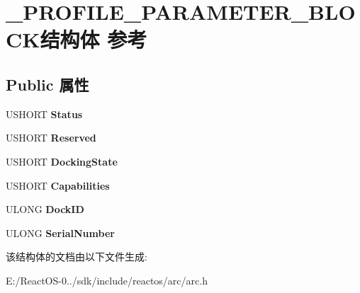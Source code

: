 \hypertarget{struct___p_r_o_f_i_l_e___p_a_r_a_m_e_t_e_r___b_l_o_c_k}{}\section{\+\_\+\+P\+R\+O\+F\+I\+L\+E\+\_\+\+P\+A\+R\+A\+M\+E\+T\+E\+R\+\_\+\+B\+L\+O\+C\+K结构体 参考}
\label{struct___p_r_o_f_i_l_e___p_a_r_a_m_e_t_e_r___b_l_o_c_k}
\subsection*{Public 属性}
\begin{DoxyCompactItemize}
\item 
\mbox{\label{struct___p_r_o_f_i_l_e___p_a_r_a_m_e_t_e_r___b_l_o_c_k_ab8d5269ed41124bcce98fec36a69e68e}} 
U\+S\+H\+O\+RT {\bfseries Status}
\item 
\mbox{\label{struct___p_r_o_f_i_l_e___p_a_r_a_m_e_t_e_r___b_l_o_c_k_a0cd9c38ae33a29549b7f6989a08affc7}} 
U\+S\+H\+O\+RT {\bfseries Reserved}
\item 
\mbox{\label{struct___p_r_o_f_i_l_e___p_a_r_a_m_e_t_e_r___b_l_o_c_k_a49898c2345052d167073129e30d5dc45}} 
U\+S\+H\+O\+RT {\bfseries Docking\+State}
\item 
\mbox{\label{struct___p_r_o_f_i_l_e___p_a_r_a_m_e_t_e_r___b_l_o_c_k_a842ec1a0f65dc72fbc49e3dd51204a58}} 
U\+S\+H\+O\+RT {\bfseries Capabilities}
\item 
\mbox{\label{struct___p_r_o_f_i_l_e___p_a_r_a_m_e_t_e_r___b_l_o_c_k_a8e064f9a061001a257aa92e32b9389b9}} 
U\+L\+O\+NG {\bfseries Dock\+ID}
\item 
\mbox{\label{struct___p_r_o_f_i_l_e___p_a_r_a_m_e_t_e_r___b_l_o_c_k_a40f60e57ae6f021d50df9d7a5501304b}} 
U\+L\+O\+NG {\bfseries Serial\+Number}
\end{DoxyCompactItemize}


该结构体的文档由以下文件生成\+:\begin{DoxyCompactItemize}
\item 
E\+:/\+React\+O\+S-\/0../sdk/include/reactos/arc/arc.\+h\end{DoxyCompactItemize}
